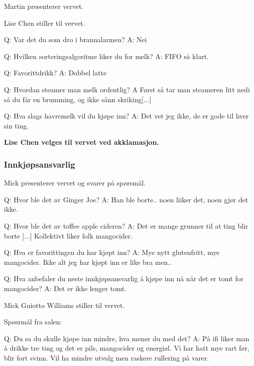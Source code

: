 \documentclass[10pt,norsk,a4paper,usenames,dvipsnames]{article}
\begin{document}
\begin{multicols}{2}
        Martin presenterer vervet.

        Lise Chen stiller til vervet.

        Q: Var det du som dro i brannalarmen?
        A: Nei

        Q: Hvilken sorteringsalgoritme liker du for melk?
        A: FIFO så klart.

        Q: Favorittdrikk?
        A: Dobbel latte

        Q: Hvordan steamer man melk ordentlig?
        A Først så tar man steameren litt nedi så du får en brumming, og ikke sånn skriking[...]

        Q: Hva slags havremelk vil du kjøpe inn?
        A: Det vet jeg ikke, de er gode til hver sin ting.



        \textbf{Lise Chen velges til vervet ved akklamasjon.}



        \subsubsection{Innkjøpsansvarlig}
        Mick presenterer vervet og svarer på spørsmål.

        Q: Hvor ble det av Ginger Joe?
        A: Han ble borte.. noen liiker det, noen gjør det ikke.

        Q: Hvor ble det av toffee apple cideren?
        A: Det er mange grunner til at ting blir borte [...] Kollektivt liker folk mangocider.

        Q: Hva er favorittingen du har kjøpt inn?
        A: Mye nytt glutenfritt, mye mangocider. Ikke alt jeg har kjøpt inn er like bra men..

        Q: Hva anbefaler du neste innkjøpsansvarlig å kjøpe inn nå når det er tomt for mangocider?
        A: Det er ikke lenger tomt.



        Mick Guiotto Williams stiller til vervet.

        Spøsrmål fra salen:

        Q: Du sa du skulle kjøpe inn mindre, hva mener du med det?
        A: På ifi liker man å drikke tre ting og det er pils, mangocider og energiøl. Vi har hatt mye rart før, blir fort svinn. Vil ha mindre utvalg men raskere rullering på varer.


\end{multicols}
\end{document}
